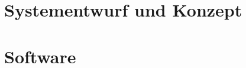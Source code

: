 

\section{Systementwurf und Konzept} \label{systementwurf-3}



\newpage
\section{Software} \label{realisierung-3}


\iffalse %
\newpage
\section{Emotionsinduktion} \label{emotionsinduktion-3}



\newpage
\section{Messreihe} \label{messreihe-3}



\newpage
\section{Mustererkennung} \label{mustererkennung-3}


\newpage
\section{Ergebnisse} \label{ergenisse-3}

\fi